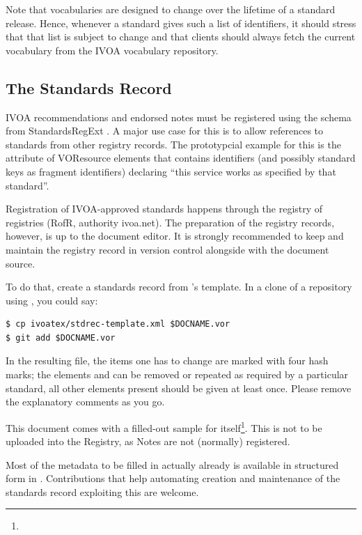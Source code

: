 \documentclass[11pt,a4paper]{ivoa}
\begin{document}
Note that vocabularies are designed to change over the lifetime of a
standard release.  Hence, whenever a standard gives such a
list of identifiers, it should stress that that list is subject to
change and that clients should always fetch the current vocabulary from
the IVOA vocabulary repository.

\subsection{The Standards Record}
\label{sect:stdrec}

IVOA recommendations and endorsed notes must be registered using the
schema from StandardsRegExt \citep{2012ivoa.spec.0508H}.  A major use
case for this is to allow references to standards from other registry
records. The prototypcial example for this is the 
attribute of VOResource  elements that contains
identifiers (and possibly standard keys as fragment identifiers)
declaring ``this service works as specified by that standard''.

Registration of IVOA-approved standards happens through the registry of
registries (RofR, authority ivoa.net).  The preparation of the registry
records, however, is up to the document editor.  It is strongly
recommended to keep and maintain the registry record in version control
alongside with the document source.

To do that, create a standards record from \ivoatex's template.  In a
clone of a repository using \ivoatex, you could say:

\begin{lstlisting}
$ cp ivoatex/stdrec-template.xml $DOCNAME.vor
$ git add $DOCNAME.vor
\end{lstlisting}

In the resulting file, the items one has to change are marked with four
hash marks; the elements  and  can be removed
or repeated as required by a particular standard, all other elements
present should be given at least once.  Please remove the explanatory
comments as you go.

This document comes with a filled-out sample for
itself\footnote{}.  This is
not to be uploaded into the Registry, as Notes are not (normally)
registered.

Most of the metadata to be filled in actually already is available in
structured form in \ivoatex.  Contributions that help automating
creation and maintenance of the standards record exploiting this are welcome.
\end{document}
